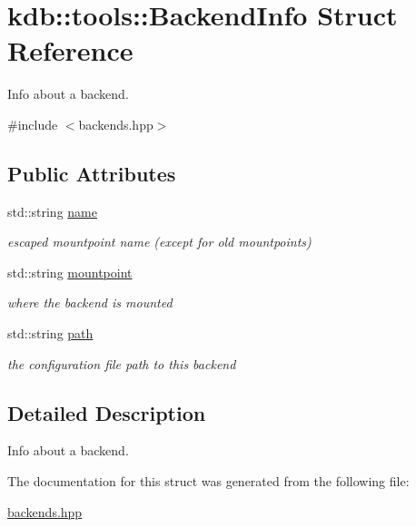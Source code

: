 \hypertarget{structkdb_1_1tools_1_1BackendInfo}{}\section{kdb\+::tools\+::Backend\+Info Struct Reference}
\label{structkdb_1_1tools_1_1BackendInfo}


Info about a backend.  




{\ttfamily \#include $<$backends.\+hpp$>$}

\subsection*{Public Attributes}
\begin{DoxyCompactItemize}
\item 
\mbox{\label{structkdb_1_1tools_1_1BackendInfo_a7da85fc3a4bbb7412b0544aceeb9da75}} 
std\+::string \mbox{\hyperlink{structkdb_1_1tools_1_1BackendInfo_a7da85fc3a4bbb7412b0544aceeb9da75}{name}}
\begin{DoxyCompactList}\small\item\em escaped mountpoint name (except for old mountpoints) \end{DoxyCompactList}\item 
\mbox{\label{structkdb_1_1tools_1_1BackendInfo_a043c4414dc2b41bab37efb3c878f6cb8}} 
std\+::string \mbox{\hyperlink{structkdb_1_1tools_1_1BackendInfo_a043c4414dc2b41bab37efb3c878f6cb8}{mountpoint}}
\begin{DoxyCompactList}\small\item\em where the backend is mounted \end{DoxyCompactList}\item 
\mbox{\label{structkdb_1_1tools_1_1BackendInfo_ac1d9984e01a78dba8e01dca0b91cbf30}} 
std\+::string \mbox{\hyperlink{structkdb_1_1tools_1_1BackendInfo_ac1d9984e01a78dba8e01dca0b91cbf30}{path}}
\begin{DoxyCompactList}\small\item\em the configuration file path to this backend \end{DoxyCompactList}\end{DoxyCompactItemize}


\subsection{Detailed Description}
Info about a backend. 

The documentation for this struct was generated from the following file\+:\begin{DoxyCompactItemize}
\item 
\mbox{\hyperlink{backends_8hpp}{backends.\+hpp}}\end{DoxyCompactItemize}
